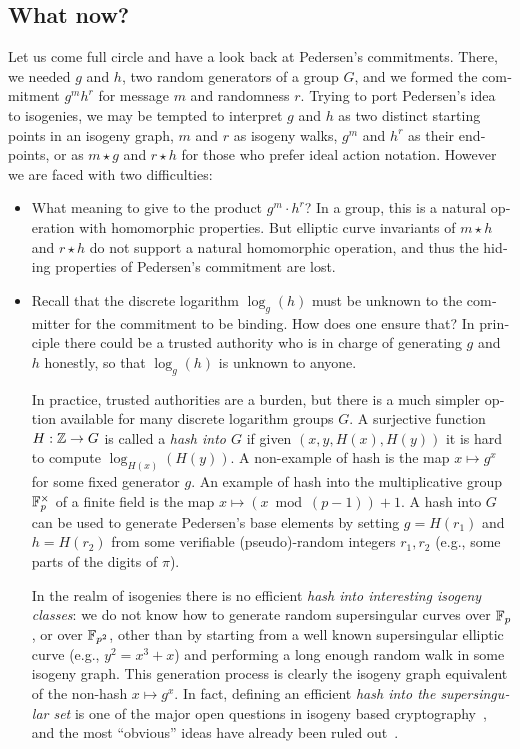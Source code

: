 \begin{otherlanguage}{english}
\section{What now?}

Let us come full circle and have a look back at Pedersen's
commitments. There, we needed $g$ and $h$, two random generators of a
group $G$, and we formed the commitment $g^mh^r$ for message $m$ and
randomness $r$.  Trying to port Pedersen's idea to isogenies, we may
be tempted to interpret $g$ and $h$ as two distinct starting points in
an isogeny graph, $m$ and $r$ as isogeny walks, $g^m$ and $h^r$ as
their endpoints, or as $m\star g$ and $r\star h$ for those who prefer
ideal action notation. However we are faced with two difficulties:
\begin{itemize}
\item What meaning to give to the product $g^m\cdot h^r$? In a group,
  this is a natural operation with homomorphic properties. But
  elliptic curve invariants of $m\star h$ and $r\star h$ do not
  support a natural homomorphic operation, and thus the hiding
  properties of Pedersen's commitment are lost.
\item Recall that the discrete logarithm $\log_g(h)$ must be unknown
  to the committer for the commitment to be binding. How does one
  ensure that? In principle there could be a trusted authority who is
  in charge of generating $g$ and $h$ honestly, so that $\log_g(h)$ is
  unknown to anyone.

  In practice, trusted authorities are a burden, but there is a much
  simpler option available for many discrete logarithm groups $G$. A
  surjective function $H:\mathbb{Z}\to G$ is called a \emph{hash into $G$} if
  given $(x,y,H(x),H(y))$ it is hard to compute $\log_{H(x)}(H(y))$. A
  non-example of hash is the map $x\mapsto g^x$ for some fixed
  generator $g$. An example of hash into the multiplicative group
  $\mathbb{F}_p^\times$ of a finite field is the map
  $x\mapsto (x\bmod(p-1)) + 1$.  A hash into $G$ can be used to
  generate Pedersen's base elements by setting $g=H(r_1)$ and
  $h=H(r_2)$ from some verifiable (pseudo)-random integers $r_1,r_2$
  (e.g., some parts of the digits of $\pi$).

  In the realm of isogenies there is no efficient \emph{hash into
    interesting isogeny classes}: we do not know how to generate
  random supersingular curves over $\mathbb{F}_p$, or over $\mathbb{F}_{p^2}$, other
  than by starting from a well known supersingular elliptic curve
  (e.g., $y^2=x^3+x$) and performing a long enough random walk in some
  isogeny graph. This generation process is clearly the isogeny graph
  equivalent of the non-hash $x\mapsto g^x$.  In fact, defining an
  efficient \emph{hash into the supersingular set} is one of the major
  open questions in isogeny based
  cryptography~\cite{galbraith2018computational}, and the most
  ``obvious'' ideas have already been ruled
  out~\cite{EC:CasPanVer20,love2019supersingular}.
\end{itemize}


\end{otherlanguage}
